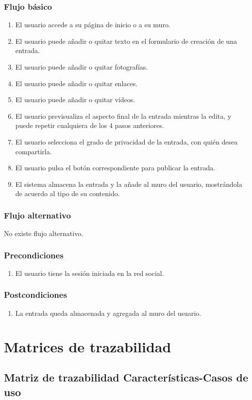 \documentclass[12pt, a4paper, titlepage]{article}
\begin{document}
\subsubsection{Flujo básico}
\begin{enumerate}
	\item El usuario accede a su página de inicio o a su muro.
	\item El usuario puede añadir o quitar texto en el formulario de creación de una entrada.
	\item El usuario puede añadir o quitar fotografías.
	\item El usuario puede añadir o quitar enlaces.
	\item El usuario puede añadir o quitar vídeos.
	\item El usuario previsualiza el aspecto final de la entrada mientras la edita, y puede repetir cualquiera de los 4 pasos anteriores.
	\item El usuario selecciona el grado de privacidad de la entrada, con quién desea compartirla.
	\item El usuario pulsa el botón correspondiente para publicar la entrada.
	\item El sistema almacena la entrada y la añade al muro del usuario, mostrándola de acuerdo al tipo de su contenido.
\end{enumerate}
\subsubsection{Flujo alternativo}
No existe flujo alternativo.
\subsubsection{Precondiciones}
\begin{enumerate}
	\item El usuario tiene la sesión iniciada en la red social.
\end{enumerate}
\subsubsection{Postcondiciones}
\begin{enumerate}
	\item La entrada queda almacenada y agregada al muro del usuario.
\end{enumerate}



\section{Matrices de trazabilidad}  
\subsection{\large Matriz de trazabilidad Características-Casos de uso}

  
\end{document}
